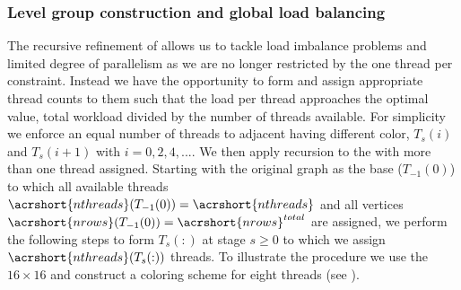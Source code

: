           
\subsubsection{Level group construction and global load balancing} \label{subsec:subgraph_selection}

The recursive refinement of \levelGroups allows us to tackle load imbalance problems and limited degree of parallelism as we are no longer restricted by the one thread per \levelGroup constraint.  Instead we have the opportunity to form \levelGroups and assign appropriate thread counts to them such that the load per thread approaches the optimal value, \ie total workload divided by the number of threads available. For simplicity we enforce an equal number of threads to adjacent \levelGroups having different color, \ie $T_s(i)$ and $T_s(i+1)$ with $i=0,2,4,...$. We then apply recursion to the \levelGroups with more than one thread assigned. Starting with the original graph as the base \levelGroup ($T_{-1}(0)$) to which all available threads $\acrshort{nthreads}(T_{-1}(0))=\acrshort{nthreads}$ and all vertices $\acrshort{nrows}(T_{-1}(0))=\acrshort{nrows}^{total}$ are assigned, we perform the following steps to form \levelGroups $T_s(:)$ at stage $s \ge 0$  to which we assign $\acrshort{nthreads}(T_{s}(:))$ threads. To illustrate the procedure we use the $16 \times 16$ \stex and construct a coloring scheme for eight threads (see ).


